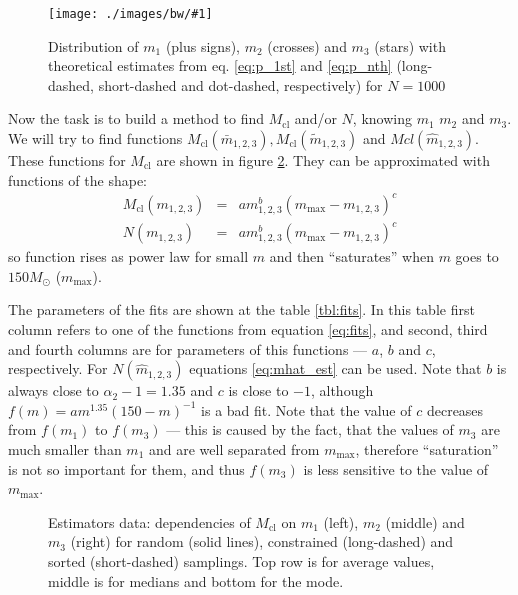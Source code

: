 \documentclass{aastex}
\newcommand{\MSun}{M_\odot}
\newcommand{\Mmax}{m_{\mathrm{max}}}
\newcommand{\Mcl}{M_{\mathrm{cl}}}
\newcommand{\includeEPSx}[1]{\texttt{[image: ./images/bw/\#1]}}
\newcommand{\includeEPS}[2]{\scalebox{#2}{\texttt{[image: ./images/bw/\#1]}}}
\begin{document}
\begin{figure}
  \begin{center}
   \includeEPSx{alg1/hist_mass.eps}
  \end{center}
 \caption{Distribution of $m_1$ (plus signs), $m_2$ (crosses) and $m_3$ (stars) with theoretical estimates from eq. \ref{eq:p_1st} and \ref{eq:p_nth} (long-dashed, short-dashed and dot-dashed, respectively) for $N = 1000$ }  \label{fig:random_hist}
\end{figure}

Now the task is to build a method to find $\Mcl$ and/or $N$, knowing $m_1$ $m_2$ and $m_3$. We will try to find functions $\Mcl (\bar{m}_{1,2,3}), \Mcl( \tilde{m}_{1,2,3})$ and $Mcl ( \hat{m}_{1,2,3} )$. These functions for $\Mcl$ are shown in figure \ref{fig:median1}. They can be approximated with functions of the shape:
\begin{eqnarray} \label{eq:fits}
  \Mcl(m_{1,2,3}) &=& a m_{1,2,3}^b (\Mmax-m_{1,2,3})^c \\ \nonumber
  N(m_{1,2,3}) &=& a m_{1,2,3}^b (\Mmax-m_{1,2,3})^c
\end{eqnarray} 
so function rises as power law for small $m$ and then ``saturates'' when $m$ goes to $150 \MSun$ ($\Mmax$).

The parameters of the fits are shown at the table \ref{tbl:fits}. In this table first column refers to one of the functions from equation  \ref{eq:fits}, and second, third and fourth columns are for parameters of this functions --- $a$, $b$ and $c$, respectively.
For $N(\hat{m}_{1,2,3})$ equations \ref{eq:mhat_est} can be used. Note that $b$ is always close to $\alpha_2 - 1 = 1.35$ and $c$ is close to $-1$, although $f(m) = a m^{1.35} (150-m)^{-1}$ is a bad fit. Note that the value of $c$ decreases from $f(m_1)$ to $f(m_3)$ --- this is caused by the fact, that the values of $m_3$ are much smaller than $m_1$ and are well separated from $\Mmax$, therefore ``saturation'' is not so important for them, and thus $f(m_3)$ is less sensitive to the value of $\Mmax$.
\begin{figure}
  \begin{center}
    \hspace{-2.4cm}
    \includeEPS{all_estimators.eps}{0.45}
  \end{center}
  \caption{Estimators data: dependencies of $\Mcl$ on $m_1$ (left), $m_2$ (middle) and $m_3$ (right) for random (solid lines), constrained (long-dashed) and sorted (short-dashed) samplings. Top row is for average values, middle is for medians and bottom for the mode.}\label{fig:median1}
\end{figure}
\end{document}
